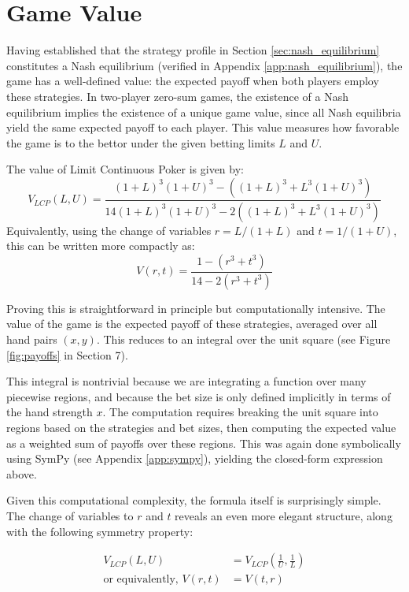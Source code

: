 \documentclass[../../main/main.tex]{subfiles}
\begin{document}
\section{Game Value}
\label{sec:game_value}

Having established that the strategy profile in Section \ref{sec:nash_equilibrium} constitutes a Nash equilibrium (verified in Appendix \ref{app:nash_equilibrium}), the game has a well-defined value: the expected payoff when both players employ these strategies. In two-player zero-sum games, the existence of a Nash equilibrium implies the existence of a unique game value, since all Nash equilibria yield the same expected payoff to each player. This value measures how favorable the game is to the bettor under the given betting limits $L$ and $U$.

\begin{theorem}
    \label{thm:game_value}
    The value of Limit Continuous Poker is given by:
    \[
        V_{LCP}(L, U) = \frac{(1 + L)^3(1+U)^3 - ((1+L)^3+L^3(1 + U)^3)}{14(1 + L)^3(1+U)^3 - 2((1+L)^3+L^3(1 + U)^3)}
    \]
    Equivalently, using the change of variables $r = L/(1+L)$ and $t = 1/(1+U)$, this can be written more compactly as:
    \[
        V(r, t) = \frac{1 - (r^3 + t^3)}{14 - 2(r^3 + t^3)}
    \]
\end{theorem}

Proving this is straightforward in principle but computationally intensive. The value of the game is the expected payoff of these strategies, averaged over all hand pairs $(x, y)$. This reduces to an integral over the unit square (see Figure \ref{fig:payoffs} in Section 7). 

This integral is nontrivial because we are integrating a function over many piecewise regions, and because the bet size is only defined implicitly in terms of the hand strength $x$. The computation requires breaking the unit square into regions based on the strategies and bet sizes, then computing the expected value as a weighted sum of payoffs over these regions. This was again done symbolically using SymPy (see Appendix \ref{app:sympy}), yielding the closed-form expression above.

Given this computational complexity, the formula itself is surprisingly simple. The change of variables to $r$ and $t$ reveals an even more elegant structure, along with the following symmetry property:

\begin{align*}
    V_{LCP}(L, U) &= V_{LCP}\left(\frac{1}{U}, \frac{1}{L}\right)\\
    \text{or equivalently, } V(r, t) &= V(t, r)
\end{align*}
\end{document}
